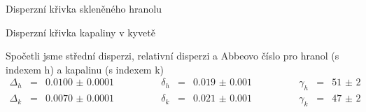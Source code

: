 \begin{graph}
  \centering
  
  \caption{Disperzní křivka skleněného hranolu}
  \label{g:h}
\end{graph}
\begin{graph}
  \centering
  
  \caption{Disperzní křivka kapaliny v kyvetě}
  \label{g:k}
\end{graph}

Spočetli jsme střední disperzi, relativní disperzi a Abbeovo číslo pro hranol (s indexem h) a kapalinu (s indexem k)
\begin{equation} \label{e:vysledky}
\begin{array}{rclrclrcl}
\Delta_h &= &\num{0.0100(1)} \qquad \qquad &\delta_h &= &\num{0.019(1)} \qquad \qquad &\gamma_h &= &\num{51(2)} \\
\Delta_k &= &\num{0.0070(1)} \qquad \qquad &\delta_k &= &\num{0.021(1)} \qquad \qquad &\gamma_k &= &\num{47(2)}
\end{array}
\end{equation}
